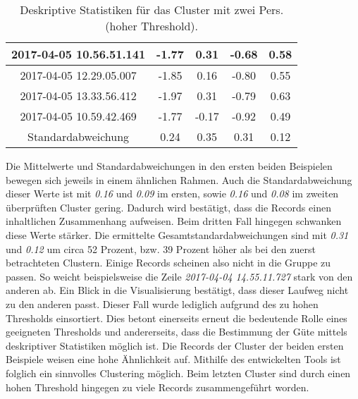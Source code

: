 \begin{table}[ht]
\begin{center}
\begin{tabular}{ |c|c|c|c|c| }
      \hline
      2017-04-05 10.56.51.141 & -1.77 & 0.31 & -0.68 & 0.58 \\
      \hline
      2017-04-05 12.29.05.007 & -1.85 & 0.16 & -0.80 & 0.55 \\
      \hline
      2017-04-05 13.33.56.412 & -1.97 & 0.31 & -0.79 & 0.63 \\
      \hline
      2017-04-05 10.59.42.469 & -1.77 & -0.17 & -0.92 & 0.49 \\
      \hline
      \hline
      Standardabweichung & 0.24 & 0.35 & 0.31 & 0.12 \\
      \hline
     \end{tabular}
    \caption{Deskriptive Statistiken für das Cluster mit zwei Pers. (hoher Threshold).}
    \label{tbl:ClustTwoPersHighThreshold}
  \end{center}
\end{table}
Die Mittelwerte und Standardabweichungen in den ersten beiden Beispielen
bewegen sich jeweils in einem ähnlichen Rahmen.
Auch die Standardabweichung dieser Werte ist mit \emph{0.16} und \emph{0.09} im ersten,
sowie \emph{0.16} und \emph{0.08} im zweiten überprüften Cluster gering.
Dadurch wird bestätigt, dass die Records einen inhaltlichen Zusammenhang aufweisen.
Beim dritten Fall hingegen schwanken diese Werte stärker.
Die ermittelte Gesamtstandardabweichungen sind mit \emph{0.31} und \emph{0.12} um
circa 52 Prozent, bzw. 39 Prozent höher als bei den zuerst betrachteten Clustern.
Einige Records scheinen also nicht in die Gruppe zu passen.
So weicht beispielsweise die Zeile \emph{2017-04-04 14.55.11.727} stark von den anderen ab.
Ein Blick in die Visualisierung bestätigt,
dass dieser Laufweg nicht zu den anderen passt.
Dieser Fall wurde lediglich aufgrund des zu hohen Thresholds einsortiert.
Dies betont einerseits erneut die bedeutende Rolle eines geeigneten Thresholds
und andererseits, dass die Bestimmung der Güte mittels deskriptiver Statistiken möglich ist.
Die Records der Cluster der beiden ersten Beispiele weisen eine hohe Ähnlichkeit auf.
Mithilfe des entwickelten Tools ist folglich ein sinnvolles Clustering möglich.
Beim letzten Cluster sind durch einen hohen Threshold hingegen zu viele Records zusammengeführt worden.